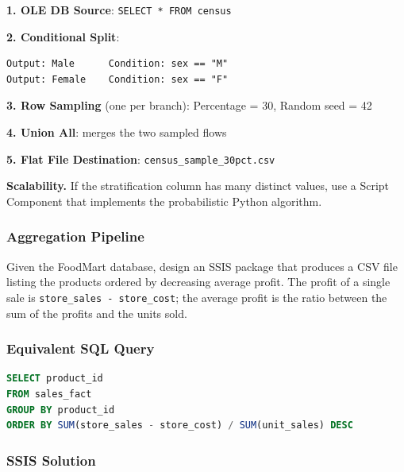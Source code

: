 \textbf{1. OLE DB Source}: \texttt{SELECT * FROM census}

\textbf{2. Conditional Split}:
\begin{lstlisting}
Output: Male      Condition: sex == "M"
Output: Female    Condition: sex == "F"
\end{lstlisting}

\textbf{3. Row Sampling} (one per branch): Percentage = 30, Random seed = 42

\textbf{4. Union All}: merges the two sampled flows

\textbf{5. Flat File Destination}: \texttt{census\_sample\_30pct.csv}

\begin{notebox}
\textbf{Scalability.} If the stratification column has many distinct values, use a Script Component that implements the probabilistic Python algorithm.
\end{notebox}

\subsubsection{Aggregation Pipeline}
\label{subsec:ex-aggregation-pipeline}

\begin{theorybox}[frametitle={Exercise}]
Given the FoodMart database, design an SSIS package that produces a CSV file listing the products ordered by decreasing average profit. The profit of a single sale is \texttt{store\_sales - store\_cost}; the average profit is the ratio between the sum of the profits and the units sold.
\end{theorybox}

\subsubsection*{Equivalent SQL Query}
\begin{lstlisting}[language=SQL]
SELECT product_id
FROM sales_fact
GROUP BY product_id
ORDER BY SUM(store_sales - store_cost) / SUM(unit_sales) DESC
\end{lstlisting}

\subsubsection*{SSIS Solution}

